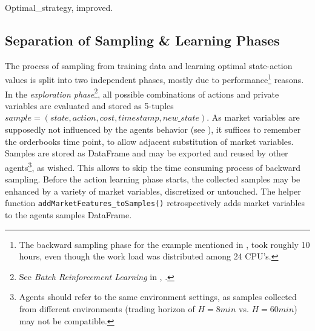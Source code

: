 \begin{algorithm}[H] 
 \caption{Optimal\_strategy, improved.}
     \SetAlgoLined
     \footnotesize
     

\label{alg:bruteforceimproved:pseudocode}
\end{algorithm}





\subsection{Separation of Sampling \& Learning Phases}
The process of sampling from training data and learning optimal state-action values is split into two independent phases, mostly due to performance\footnote{The backward sampling phase for the example mentioned in , took roughly 10 hours, even though the work load was distributed among 24 CPU's.} reasons. In the \emph{exploration phase}\footnote{See \emph{Batch Reinforcement Learning} in , .}, all possible combinations of actions and private variables are evaluated and stored as 5-tuples $sample=(state, action, cost, timestamp, new\_state)$. As market variables are supposedly not influenced by the agents behavior (see ), it suffices to remember the orderbooks time point, to allow adjacent substitution of market variables.\\

Samples are stored as DataFrame and may be exported and reused by other agents\footnote{Agents should refer to the same environment settings, as samples collected from different environments (\eg trading horizon of $H=8min$ vs. $H=60min$) may not be compatible.}, as wished. This allows to skip the time consuming process of backward sampling. Before the action learning phase starts, the collected samples may be enhanced by a variety of market variables, discretized or untouched. The helper function \lstinline!addMarketFeatures_toSamples()! retrospectively adds market variables to the agents samples DataFrame.\\

